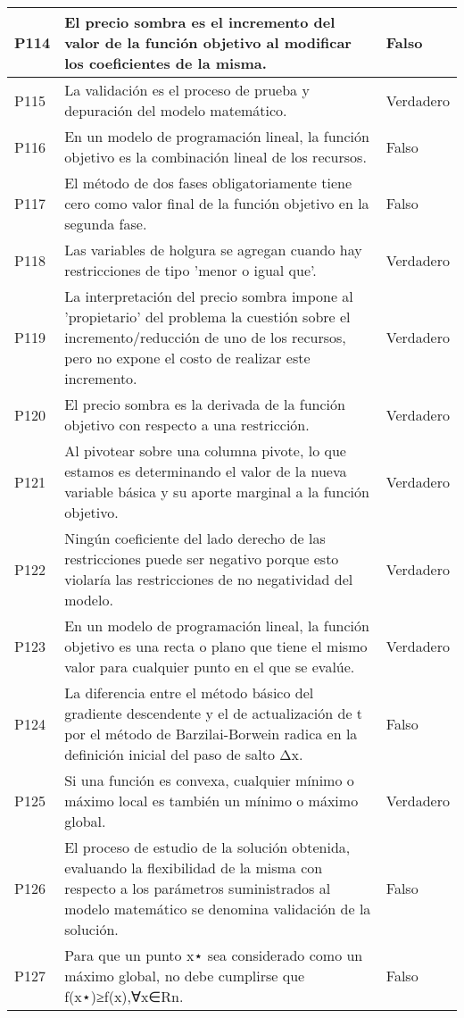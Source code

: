 \documentclass{article}
\begin{document}
\begin{longtable}{|>{\centering\arraybackslash}p{1.5cm}|>{\raggedright\arraybackslash}p{14cm}|>{\centering\arraybackslash}p{2cm}|}
\hline
P114 & El precio sombra es el incremento del valor de la función objetivo al modificar los coeficientes de la misma. & Falso \\
\hline
P115 & La validación es el proceso de prueba y depuración del modelo matemático. & Verdadero \\
\hline
P116 & En un modelo de programación lineal, la función objetivo es la combinación lineal de los recursos. & Falso \\
\hline
P117 & El método de dos fases obligatoriamente tiene cero como valor final de la función objetivo en la segunda fase. & Falso \\
\hline
P118 & Las variables de holgura se agregan cuando hay restricciones de tipo 'menor o igual que'. & Verdadero \\
\hline
P119 & La interpretación del precio sombra impone al 'propietario' del problema la cuestión sobre el incremento/reducción de uno de los recursos, pero no expone el costo de realizar este incremento. & Verdadero \\
\hline
P120 & El precio sombra es la derivada de la función objetivo con respecto a una restricción. & Verdadero \\
\hline
P121 & Al pivotear sobre una columna pivote, lo que estamos es determinando el valor de la nueva variable básica y su aporte marginal a la función objetivo. & Verdadero \\
\hline
P122 & Ningún coeficiente del lado derecho de las restricciones puede ser negativo porque esto violaría las restricciones de no negatividad del modelo. & Verdadero \\
\hline
P123 & En un modelo de programación lineal, la función objetivo es una recta o plano que tiene el mismo valor para cualquier punto en el que se evalúe. & Verdadero \\
\hline
P124 & La diferencia entre el método básico del gradiente descendente y el de actualización de t por el método de Barzilai-Borwein radica en la definición inicial del paso de salto Δx. & Falso \\
\hline
P125 & Si una función es convexa, cualquier mínimo o máximo local es también un mínimo o máximo global. & Verdadero \\
\hline
P126 & El proceso de estudio de la solución obtenida, evaluando la flexibilidad de la misma con respecto a los parámetros suministrados al modelo matemático se denomina validación de la solución. & Falso \\
\hline
P127 & Para que un punto x⋆ sea considerado como un máximo global, no debe cumplirse que f(x⋆)≥f(x),∀x∈Rn. & Falso \\

\end{longtable}
\end{document}
